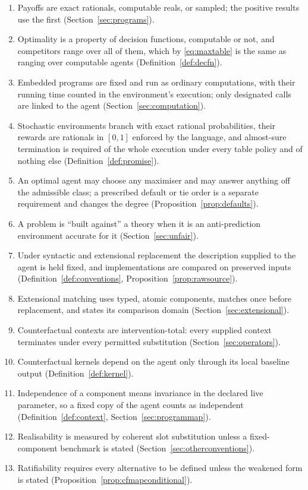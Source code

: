 \begin{enumerate}[label=\arabic*.,ref=\arabic*,leftmargin=2em,itemsep=.3em]
  \item Payoffs are exact rationals, computable reals, or sampled; the positive results use the first
        (Section~\ref{sec:programs}).
  \item Optimality is a property of decision functions, computable or not, and competitors range
        over all of them, which by \eqref{eq:maxtable} is the same as ranging over computable agents
        (Definition~\ref{def:decfn}).
  \item Embedded programs are fixed and run as ordinary computations, with their running time
        counted in the environment's execution; only designated calls are linked to the agent
        (Section~\ref{sec:computation}).
  \item Stochastic environments branch with exact rational probabilities, their rewards are rationals
        in $[0,1]$ enforced by the language, and almost-sure termination is required of the whole
        execution under every table policy and of nothing else (Definition~\ref{def:promise}).
  \item An optimal agent may choose any maximiser and may answer anything off the admissible class;
        a prescribed default or tie order is a separate requirement and changes the degree
        (Proposition~\ref{prop:defaults}).
  \item A problem is \enquote{built against} a theory when it is an anti-prediction environment
        accurate for it (Section~\ref{sec:unfair}).
  \item Under syntactic and extensional replacement the description supplied to the agent is held fixed,
        and implementations are compared on preserved inputs (Definition~\ref{def:conventions},
        Proposition~\ref{prop:rawsource}).
  \item Extensional matching uses typed, atomic components, matches once before replacement, and states
        its comparison domain (Section~\ref{sec:extensional}).
  \item Counterfactual contexts are intervention-total: every supplied context terminates under every
        permitted substitution (Section~\ref{sec:operators}).
  \item Counterfactual kernels depend on the agent only through its local baseline output
        (Definition~\ref{def:kernel}).
  \item Independence of a component means invariance in the declared live parameter, so a fixed copy of
        the agent counts as independent (Definition~\ref{def:context}, Section~\ref{sec:programmap}).
  \item Realisability is measured by coherent slot substitution unless a fixed-component benchmark is
        stated (Section~\ref{sec:otherconventions}).
  \item Ratifiability requires every alternative to be defined unless the weakened form  is
        stated (Proposition~\ref{prop:cfmapconditional}).
\end{enumerate}
